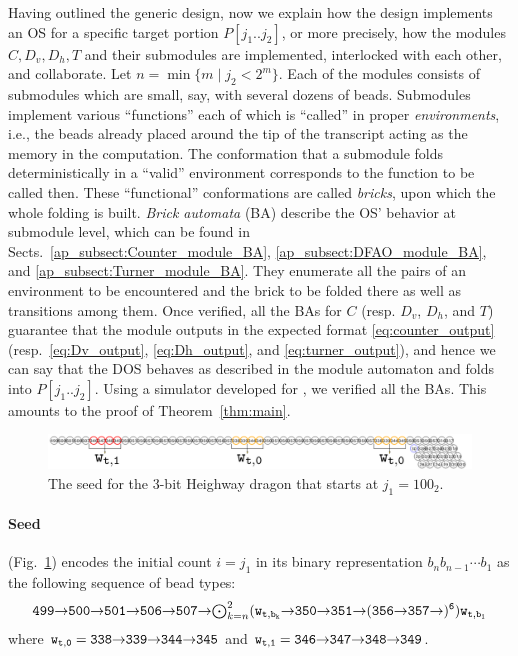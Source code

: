 \documentclass[dvipdfmx,review]{elsarticle}
\newcommand{\east}{{\ensuremath \to}}
\newcommand{\se}{{\ensuremath \searrow}}
\begin{document}
Having outlined the generic design, now we explain how the design implements an OS for a specific target portion $P[j_1 .. j_2]$, or more precisely, how the modules $C, D_v, D_h, T$ and their submodules are implemented, interlocked with each other, and collaborate. 
Let $n = \min\{m \mid j_2 < 2^m\}$. 
Each of the modules consists of submodules which are small, say, with several dozens of beads. 
Submodules implement various ``functions'' each of which is ``called'' in proper \textit{environments}, i.e., the beads already placed around the tip of the transcript acting as the memory in the computation. 
The conformation that a submodule folds deterministically in a ``valid'' environment corresponds to the function to be called then. 
These ``functional'' conformations are called \textit{bricks}, upon which the whole folding is built. 
\textit{Brick automata} (BA) describe the OS' behavior at submodule level, which can be found in Sects.~\ref{ap_subsect:Counter_module_BA}, \ref{ap_subsect:DFAO_module_BA}, and \ref{ap_subsect:Turner_module_BA}.
They enumerate all the pairs of an environment to be encountered and the brick to be folded there as well as transitions among them. 
Once verified, all the BAs for $C$ (resp. $D_v$, $D_h$, and $T$) guarantee that the module outputs in the expected format \eqref{eq:counter_output} (resp.~\eqref{eq:Dv_output}, \eqref{eq:Dh_output}, and \eqref{eq:turner_output}), and hence we can say that the DOS behaves as described in the module automaton and folds into $P[j_1 .. j_2]$. 
Using a simulator developed for \cite{HaKiOtSe2016}, we verified all the BAs. 
This amounts to the proof of Theorem~\ref{thm:main}. 


\begin{figure}[tb]
\includegraphics[width=\linewidth]{Figs/seed_sample2.png}
\caption{The seed for the 3-bit Heighway dragon that starts at $j_1 = 100_2$.}
\label{fig:seed}
\end{figure}

\paragraph{Seed} (Fig.~\ref{fig:seed}) encodes the initial count $i = j_1$ in its binary representation $b_n b_{n-1} \cdots b_1$ as the following sequence of bead types: 
\begin{equation}\label{eq:turner_output}
	{\tt 499 \east 500 \east 501 \east 506 \east 507 \east \mbox{$\bigodot_{k = n}^2$} (w_{t, b_k} \east 350 \east 351 \east (356 \east 357 \east)^6) w_{t, b_1}} 
\end{equation}
where ${\tt w_{t, 0} = 338 \east 339 \east 344 \east 345}$ and ${\tt w_{t, 1} = 346 \east 347 \east 348 \east 349}$. 
\end{document}
